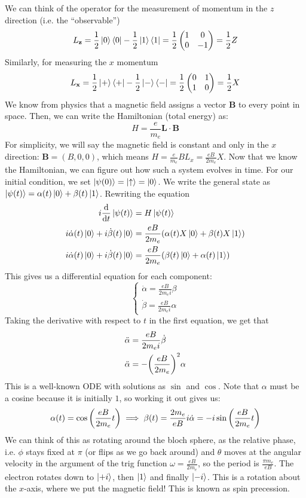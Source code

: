 We can think of the operator for the measurement of momentum in the $z$ direction (i.e. the ``observable'')
\[ L_{\mathbf{z}} = \frac{1}{2} \ket{0} \bra{0} - \frac{1}{2} \ket{1} \bra{1} = \frac{1}{2} \begin{pmatrix}
    1 & 0 \\ 0 & -1
 \end{pmatrix} = \frac{1}{2} Z \]
Similarly, for measuring the $x$ momentum
\[ L_{\mathbf{x}} = \frac{1}{2} \ket{+} \bra{+} - \frac{1}{2} \ket{-} \bra{-} = \frac{1}{2} \begin{pmatrix}
    0 & 1 \\ 1 & 0
 \end{pmatrix} = \frac{1}{2} X \]
We know from physics that a magnetic field assigns a vector $\mathbf{B}$ to every point in space. Then, we can write the Hamiltonian (total energy) as:
\[ H = \frac{e}{m_e} \mathbf{L} \cdot \mathbf{B} \]
For simplicity, we will say the magnetic field is constant and only in the $x$ direction: $\mathbf{B} = (B, 0, 0)$,
which means $H = \frac{e}{m_e} BL_x = \frac{eB}{2m_e} X$. Now that we know the Hamiltonian, we can figure out how such a system evolves in time. For our
initial condition, we set $\ket{\psi(0)} = \ket{\uparrow} = \ket{0}$. We write the general state as $\ket{\psi(t)} = \alpha(t) \ket{0} + \beta(t) \ket{1}$.
Rewriting the equation
\begin{align*}
    i \dv{}{t} \ket{\psi(t)} &= H \ket{\psi(t)} \\
    i \dot{\alpha}(t) \ket{0} + i \dot{\beta}(t) \ket{0} &= \frac{eB}{2m_e} \qty(\alpha(t) X \ket{0} + \beta(t) X \ket{1}) \\
    i \dot{\alpha}(t) \ket{0} + i \dot{\beta}(t) \ket{0} &= \frac{eB}{2m_e} \qty(\beta(t) \ket{0} + \alpha(t) \ket{1})
\end{align*}
This gives us a differential equation for each component:
\[ \begin{cases} \dot{\alpha} = \frac{eB}{2m_e i} \beta \\ \dot{\beta} = \frac{eB}{2m_e i} \alpha \end{cases} \]
Taking the derivative with respect to $t$ in the first equation, we get that
\begin{align*}
    \ddot{\alpha} &= \frac{eB}{2m_e i} \dot{\beta} \\
    \ddot{\alpha} &= - \qty(\frac{eB}{2m_e})^2 \alpha
\end{align*}
This is a well-known ODE with solutions as $\sin$ and $\cos$. Note that $\alpha$ must be a cosine because it is initially $1$, so working it out gives us:
\[ \alpha(t) = \cos\qty(\frac{eB}{2m_e} t) \implies \beta(t) = \frac{2m_e}{eB} i \dot{\alpha} = - i \sin\qty(\frac{eB}{2m_e} t) \]
We can think of this as rotating around the bloch sphere, as the relative phase, i.e. $\phi$ stays fixed at $\pi$ (or flips as we go back around) and $\theta$ moves at the angular velocity
in the argument of the trig function $\omega = \frac{eB}{2m_e}$, so the period is $\frac{\pi m_e}{eB}$.
The electron rotates down to $\ket{+i}$, then $\ket{1}$ and finally $\ket{-i}$. This is a rotation about the $x$-axis, where we put the magnetic field! This is known as spin precession.

